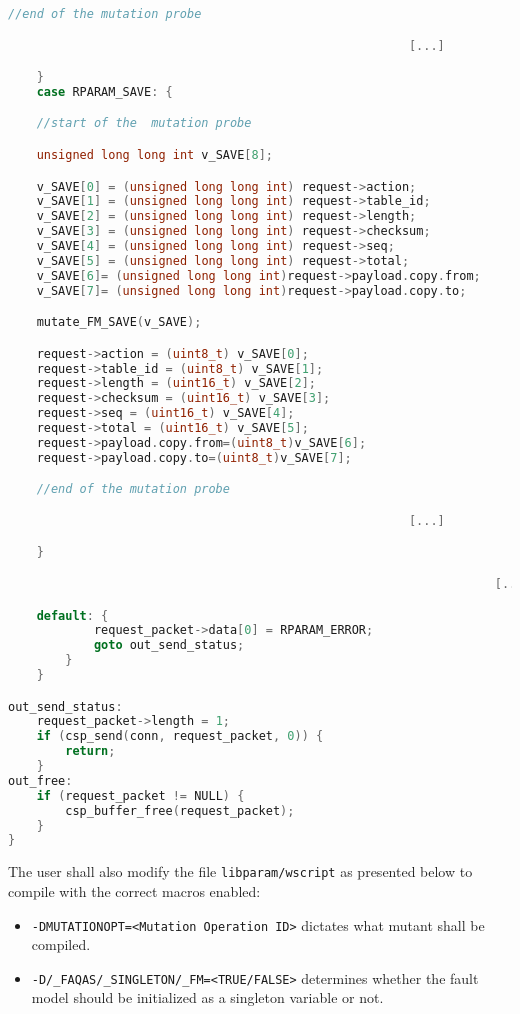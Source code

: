\begin{lstlisting}[language=c]
    //end of the mutation probe

														[...]

	}
	case RPARAM_SAVE: {

    //start of the  mutation probe

    unsigned long long int v_SAVE[8];

    v_SAVE[0] = (unsigned long long int) request->action;
    v_SAVE[1] = (unsigned long long int) request->table_id;
    v_SAVE[2] = (unsigned long long int) request->length;
    v_SAVE[3] = (unsigned long long int) request->checksum;
    v_SAVE[4] = (unsigned long long int) request->seq;
    v_SAVE[5] = (unsigned long long int) request->total;
    v_SAVE[6]= (unsigned long long int)request->payload.copy.from;
    v_SAVE[7]= (unsigned long long int)request->payload.copy.to;

    mutate_FM_SAVE(v_SAVE);

    request->action = (uint8_t) v_SAVE[0];
    request->table_id = (uint8_t) v_SAVE[1];
    request->length = (uint16_t) v_SAVE[2];
    request->checksum = (uint16_t) v_SAVE[3];
    request->seq = (uint16_t) v_SAVE[4];
    request->total = (uint16_t) v_SAVE[5];
    request->payload.copy.from=(uint8_t)v_SAVE[6];
    request->payload.copy.to=(uint8_t)v_SAVE[7];

    //end of the mutation probe

          												[...]

	}

																	[...]

	default: {
            request_packet->data[0] = RPARAM_ERROR;
            goto out_send_status;
        }
    }

out_send_status:
    request_packet->length = 1;
    if (csp_send(conn, request_packet, 0)) {
        return;
    }
out_free:
    if (request_packet != NULL) {
        csp_buffer_free(request_packet);
    }
}
\end{lstlisting}

The user shall also modify the file \texttt{libparam/wscript} as presented below to compile with the correct macros enabled:
\begin{itemize}
	\item \texttt{-DMUTATIONOPT=<Mutation Operation ID>} dictates what mutant shall be compiled.
	\item \texttt{-D/_FAQAS/_SINGLETON/_FM=<TRUE/FALSE>} determines whether the fault model should be initialized as a singleton variable or not.
\end{itemize}

